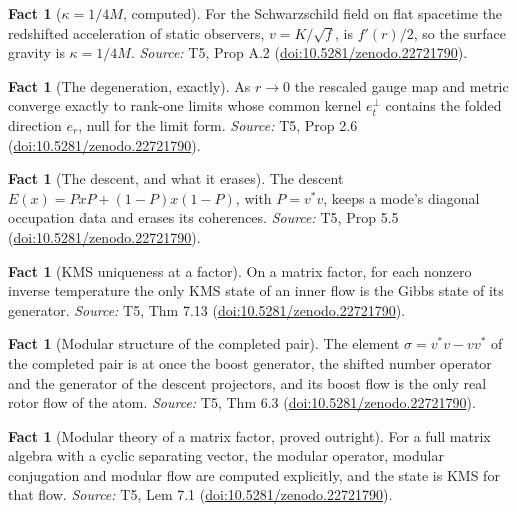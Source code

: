 \documentclass[11pt]{article}
\theoremstyle{definition}
\newtheorem{fact}[theorem]{Fact}
\theoremstyle{plain}
\providecommand{\er}{}\renewcommand{\er}{e_r}
\providecommand{\et}{}\renewcommand{\et}{e_t}
\begin{document}
\begin{fact}[$\kappa = 1/4M$, computed]\label{c:singularity.computed}
For the Schwarzschild field on flat spacetime the redshifted acceleration of static observers, $v = K/\sqrt f$, is $f'(r)/2$, so the surface gravity is $\kappa = 1/4M$.
\emph{Source:} T5, Prop A.2 (\href{https://doi.org/10.5281/zenodo.22721790}{doi:10.5281/zenodo.22721790}).
\end{fact}

\begin{fact}[The degeneration, exactly]\label{c:singularity.degeneration-exactly}
As $r \to 0$ the rescaled gauge map and metric converge exactly to rank-one limits whose common kernel $\et^{\perp}$ contains the folded direction $\er$, null for the limit form.
\emph{Source:} T5, Prop 2.6 (\href{https://doi.org/10.5281/zenodo.22721790}{doi:10.5281/zenodo.22721790}).
\end{fact}

\begin{fact}[The descent, and what it erases]\label{c:singularity.descent-what-it-erases}
The descent $E(x) = PxP + (1-P)x(1-P)$, with $P = v^* v$, keeps a mode's diagonal occupation data and erases its coherences.
\emph{Source:} T5, Prop 5.5 (\href{https://doi.org/10.5281/zenodo.22721790}{doi:10.5281/zenodo.22721790}).
\end{fact}

\begin{fact}[KMS uniqueness at a factor]\label{c:singularity.kms-uniqueness-factor}
On a matrix factor, for each nonzero inverse temperature the only KMS state of an inner flow is the Gibbs state of its generator.
\emph{Source:} T5, Thm 7.13 (\href{https://doi.org/10.5281/zenodo.22721790}{doi:10.5281/zenodo.22721790}).
\end{fact}

\begin{fact}[Modular structure of the completed pair]\label{c:singularity.modular-structure-completed-pair}
The element $\sigma = v^*v - vv^*$ of the completed pair is at once the boost generator, the shifted number operator and the generator of the descent projectors, and its boost flow is the only real rotor flow of the atom.
\emph{Source:} T5, Thm 6.3 (\href{https://doi.org/10.5281/zenodo.22721790}{doi:10.5281/zenodo.22721790}).
\end{fact}

\begin{fact}[Modular theory of a matrix factor, proved outright]\label{c:singularity.modular-theory-matrix-factor-proved-outright}
For a full matrix algebra with a cyclic separating vector, the modular operator, modular conjugation and modular flow are computed explicitly, and the state is KMS for that flow.
\emph{Source:} T5, Lem 7.1 (\href{https://doi.org/10.5281/zenodo.22721790}{doi:10.5281/zenodo.22721790}).
\end{fact}
\end{document}
